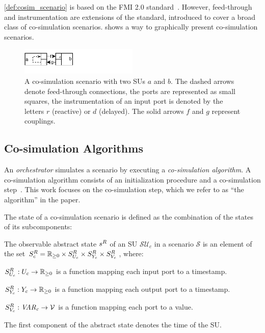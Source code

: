 \cref{def:cosim_scenario} is based on the FMI 2.0 standard~\cite{FMI2014}. 
However, feed-through and instrumentation are extensions of the standard, introduced to cover a broad class of co-simulation scenarios. 
 shows a way to graphically present co-simulation scenarios.

\begin{figure}[htb]
  \centering
  \includegraphics[width=0.5\textwidth]{images/simple_example.pdf}
  \caption{A co-simulation scenario with two SUs $a$ and $b$. 
  The dashed arrows denote feed-through connections, the ports are represented as small squares, the instrumentation of an input port is denoted by the letters $r$ (reactive) or $d$ (delayed).
  The solid arrows $f$ and $g$ represent couplings.}
  \label{fig:simpleexample}  
\end{figure}

\subsection{Co-simulation Algorithms}\label{sc:cosimalgo}
An \emph{orchestrator} simulates a scenario by executing a \emph{co-simulation algorithm}.
A co-simulation algorithm consists of an initialization procedure and a co-simulation step~\cite{FMI2014}.
This work focuses on the co-simulation step, which we refer to as ``the algorithm'' in the paper.

The state of a co-simulation scenario is defined as the combination of the states of its subcomponents:

\begin{definition}\label{def:runtime_state}
  The observable abstract state $s^{R}_{}$ of an SU $\mathcal{SU}_c$ in a scenario $\mathcal{S}$ is an element of the set $S^{R}_{c} = \mathbb{R}_{\geq 0} \times S^{R}_{U_{c}} \times S^{R}_{Y_{c}} \times S^{R}_{V_c}$, where:
  \begin{compactitem}
    \item $S^{R}_{U_{c}} : U_{c} \to \mathbb{R}_{\geq 0}$ is a function mapping each input port to a timestamp.  
    \item $S^{R}_{Y_{c}} : Y_{c} \to \mathbb{R}_{\geq 0}$ is a function mapping each output port to a timestamp.  
    \item $S^{R}_{V_c} : \mathit{VAR_{c}} \to \mathcal{V}$ is a function mapping each port to a value.  
  \end{compactitem}
  The first component of the abstract state denotes the time of the SU.
\end{definition}

